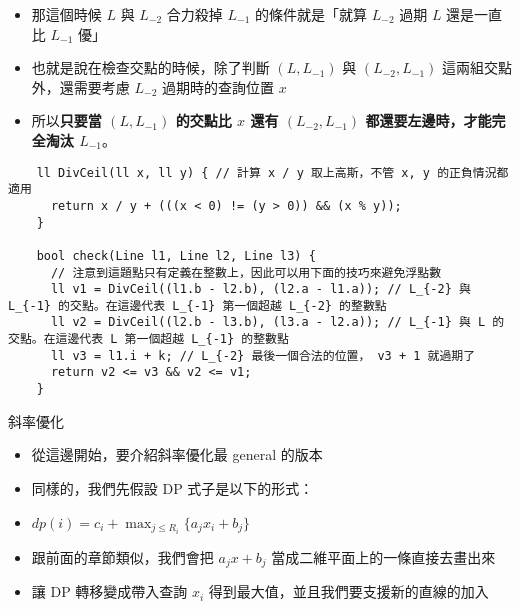 \documentclass[standalone]{beamer}
\begin{document}
\begin{frame}{}
  \begin{itemize}
    \item 那這個時候 $L$ 與 $L_{-2}$ 合力殺掉 $L_{-1}$ 的條件就是「就算 $L_{-2}$ 過期 $L$ 還是一直比 $L_{-1}$ 優」
    \item 也就是說在檢查交點的時候，除了判斷 $(L, L_{-1})$ 與 $(L_{-2}, L_{-1})$ 這兩組交點外，還需要考慮 $L_{-2}$ 過期時的查詢位置 $x$
    \item 所以\textbf{只要當 $(L, L_{-1})$ 的交點比 $x$ 還有 $(L_{-2}, L_{-1})$ 都還要左邊時，才能完全淘汰 $L_{-1}$}。
  \end{itemize}
\end{frame}



\begin{frame}[fragile]{}
  \begin{verbatim}
    ll DivCeil(ll x, ll y) { // 計算 x / y 取上高斯，不管 x, y 的正負情況都適用
      return x / y + (((x < 0) != (y > 0)) && (x % y));
    }

    bool check(Line l1, Line l2, Line l3) {
      // 注意到這題點只有定義在整數上，因此可以用下面的技巧來避免浮點數
      ll v1 = DivCeil((l1.b - l2.b), (l2.a - l1.a)); // L_{-2} 與 L_{-1} 的交點。在這邊代表 L_{-1} 第一個超越 L_{-2} 的整數點
      ll v2 = DivCeil((l2.b - l3.b), (l3.a - l2.a)); // L_{-1} 與 L 的交點。在這邊代表 L 第一個超越 L_{-1} 的整數點
      ll v3 = l1.i + k; // L_{-2} 最後一個合法的位置， v3 + 1 就過期了
      return v2 <= v3 && v2 <= v1;
    }
  \end{verbatim}
\end{frame}

\begin{frame}{斜率優化}
  \begin{itemize}
    \item 從這邊開始，要介紹斜率優化最 general 的版本
    \item 同樣的，我們先假設 DP 式子是以下的形式：
    \item $dp(i) = c_i + \max_{j \leq R_i} \{a_jx_i + b_j\}$
    \item 跟前面的章節類似，我們會把 $a_jx + b_j$ 當成二維平面上的一條直接去畫出來
    \item 讓 DP 轉移變成帶入查詢 $x_i$ 得到最大值，並且我們要支援新的直線的加入
  \end{itemize}
\end{frame}
\end{document}
